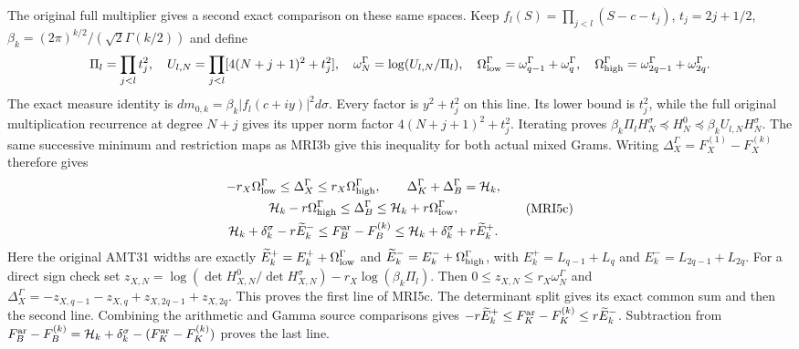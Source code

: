 \documentclass[11pt,a4paper]{article}
\begin{document}
The original full multiplier gives a second exact comparison
on these same spaces. Keep $f_l(S)=\prod_{j<l}(S-c-t_j)$,
$t_j=2j+1/2$, $\beta_k=(2\pi)^{k/2}/(\sqrt2\Gamma(k/2))$
and define
\[
 \Pi_l=\prod_{j<l}t_j^2,\quad
 U_{l,N}=\prod_{j<l}[4(N+j+1)^2+t_j^2],\quad
 \omega_N^\Gamma=\log(U_{l,N}/\Pi_l),\quad
 \Omega_{\rm low}^\Gamma=\omega_{q-1}^\Gamma+\omega_q^\Gamma,
 \quad\Omega_{\rm high}^\Gamma=\omega_{2q-1}^\Gamma+\omega_{2q}^\Gamma.
\]
The exact measure identity is
$dm_{0,k}=\beta_k|f_l(c+iy)|^2d\sigma$.
Every factor is $y^2+t_j^2$ on this line. Its lower bound
is $t_j^2$, while the full original multiplication recurrence
at degree $N+j$ gives its upper norm factor
$4(N+j+1)^2+t_j^2$. Iterating proves
$\beta_k\Pi_lH_N^\sigma\preceq H_N^0
\preceq\beta_kU_{l,N}H_N^\sigma$.
The same successive minimum and restriction maps as MRI3b
give this inequality for both actual mixed Grams.
Writing $\Delta_X^\Gamma=F_X^{(1)}-F_X^{(k)}$ therefore gives
\[
\begin{gathered}
 -r_X\Omega_{\rm low}^\Gamma\le\Delta_X^\Gamma
                              \le r_X\Omega_{\rm high}^\Gamma,
 \qquad\Delta_K^\Gamma+\Delta_B^\Gamma=\mathcal H_k,\\
 \mathcal H_k-r\Omega_{\rm high}^\Gamma
       \le\Delta_B^\Gamma\le
               \mathcal H_k+r\Omega_{\rm low}^\Gamma,\\
 \mathcal H_k+\delta_k^\sigma-r\widetilde E_k^-
       \le F_B^{\rm ar}-F_B^{(k)}\le
                  \mathcal H_k+\delta_k^\sigma+r\widetilde E_k^+.
\end{gathered}\tag{MRI5c}
\]
Here the original AMT31 widths are exactly
$\widetilde E_k^+=E_k^++\Omega_{\rm low}^\Gamma$ and
$\widetilde E_k^-=E_k^-+\Omega_{\rm high}^\Gamma$,
with $E_k^+=L_{q-1}+L_q$ and $E_k^-=L_{2q-1}+L_{2q}$.
For a direct sign check set
$z_{X,N}=\log(\det H_{X,N}^0/\det H_{X,N}^\sigma)
-r_X\log(\beta_k\Pi_l)$.
Then $0\le z_{X,N}\le r_X\omega_N^\Gamma$ and
$\Delta_X^\Gamma=-z_{X,q-1}-z_{X,q}+z_{X,2q-1}+z_{X,2q}$.
This proves the first line of MRI5c. The determinant split
gives its exact common sum and then the second line.
Combining the arithmetic and Gamma source comparisons gives
$-r\widetilde E_k^+\le F_K^{\rm ar}-F_K^{(k)}
\le r\widetilde E_k^-$. Subtraction from
$F_B^{\rm ar}-F_B^{(k)}=\mathcal H_k+\delta_k^\sigma
-(F_K^{\rm ar}-F_K^{(k)})$ proves the last line.
\end{document}
